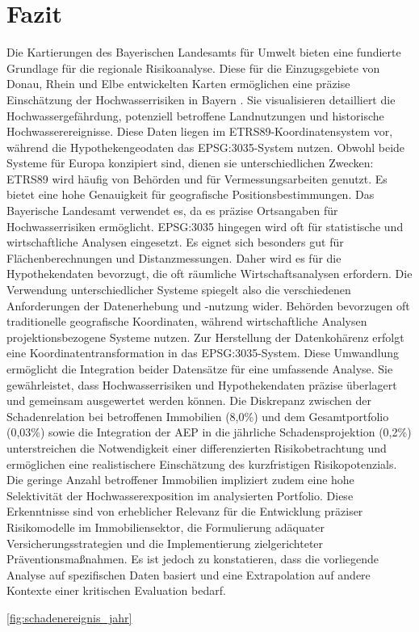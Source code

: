  \section{Fazit}
 Die Kartierungen des Bayerischen Landesamts für Umwelt bieten eine fundierte Grundlage für die regionale Risikoanalyse. Diese für die Einzugsgebiete von Donau, Rhein und Elbe entwickelten Karten ermöglichen eine präzise Einschätzung der Hochwasserrisiken in Bayern \parencite{LfU_Bayern}. Sie visualisieren detailliert die Hochwassergefährdung, potenziell betroffene Landnutzungen und historische Hochwasserereignisse.
Diese Daten liegen im ETRS89-Koordinatensystem vor, während die Hypothekengeodaten das EPSG:3035-System nutzen. Obwohl beide Systeme für Europa konzipiert sind, dienen sie unterschiedlichen Zwecken:
ETRS89 wird häufig von Behörden und für Vermessungsarbeiten genutzt. Es bietet eine hohe Genauigkeit für geografische Positionsbestimmungen. Das Bayerische Landesamt verwendet es, da es präzise Ortsangaben für Hochwasserrisiken ermöglicht.
EPSG:3035 hingegen wird oft für statistische und wirtschaftliche Analysen eingesetzt. Es eignet sich besonders gut für Flächenberechnungen und Distanzmessungen. Daher wird es für die Hypothekendaten bevorzugt, die oft räumliche Wirtschaftsanalysen erfordern.
Die Verwendung unterschiedlicher Systeme spiegelt also die verschiedenen Anforderungen der Datenerhebung und -nutzung wider. Behörden bevorzugen oft traditionelle geografische Koordinaten, während wirtschaftliche Analysen projektionsbezogene Systeme nutzen.
Zur Herstellung der Datenkohärenz erfolgt eine Koordinatentransformation in das EPSG:3035-System. Diese Umwandlung ermöglicht die Integration beider Datensätze für eine umfassende Analyse. Sie gewährleistet, dass Hochwasserrisiken und Hypothekendaten präzise überlagert und gemeinsam ausgewertet werden können.
Die Diskrepanz zwischen der Schadenrelation bei betroffenen Immobilien (8,0\%) und dem Gesamtportfolio (0,03\%) sowie die Integration der AEP in die jährliche Schadensprojektion (0,2\%) unterstreichen die Notwendigkeit einer differenzierten Risikobetrachtung und ermöglichen eine realistischere Einschätzung des kurzfristigen Risikopotenzials. Die geringe Anzahl betroffener Immobilien impliziert zudem eine hohe Selektivität der Hochwasserexposition im analysierten Portfolio. Diese Erkenntnisse sind von erheblicher Relevanz für die Entwicklung präziser Risikomodelle im Immobiliensektor, die Formulierung adäquater Versicherungsstrategien und die Implementierung zielgerichteter Präventionsmaßnahmen. Es ist jedoch zu konstatieren, dass die vorliegende Analyse auf spezifischen Daten basiert und eine Extrapolation auf andere Kontexte einer kritischen Evaluation bedarf.

\ref{fig:schadenereignis_jahr} 